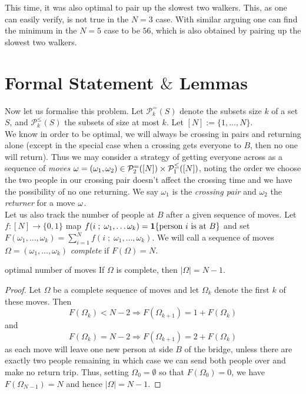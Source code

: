 \documentclass{article}
\begin{document}
This time, it was also optimal to pair up the slowest two walkers. This, as one can easily verify, is not true in the $N=3$ case. With similar 
arguing one can find the minimum in the $N=5$ case to be $56$, which is also obtained by pairing up the slowest two walkers. 

\section{Formal Statement $\&$ Lemmas}

Now let us formalise this problem. Let $\mathcal{P}_k^=(S)$ denote the subsets size $k$ of a set $S$, and $\mathcal{P}_{k}^\leq(S)$ the subsets 
of size at most $k$. Let $[N] := \{1, \dots, N\}$. \\

We know in order to be optimal, we will always be crossing in pairs and returning alone (except in the special case when a crossing gets everyone 
to $B$, then no one will return). Thus we may consider a strategy of getting everyone across as a sequence of {\it moves} ${\bf \omega} 
= (\omega_1, \omega_2) \in \mathcal{P}_2^=([N]) \times \mathcal{P}_1^\leq([N])$, noting the order we choose the two people in our crossing pair 
doesn't affect the crossing time and we have the possibility of no one returning. We say $\omega_1$ is the {\it crossing pair} and $\omega_2$ the 
{\it returner} for a move ${\bf \omega}$. \\

Let us also track the number of people at $B$ after a given sequence of moves. Let $f: [N] \to \{0,1\}$ map $f(i \; ; \; \omega_1, \dots \omega_k) 
= {\bf 1}\{\text{person } i \text{ is at } B\}$ and set $F(\omega_1, \dots, \omega_k) = \sum_{i=1}^N f(i \; ; \; \omega_1, \dots, \omega_k)$. We 
will call a sequence of moves $\Omega = (\omega_1, \dots, \omega_k)$ {\it complete} if $F(\Omega) = N$. 


\begin{lemma}[]{optimal number of moves}
  If $\Omega$ is complete, then $|\Omega| = N-1$. 
\end{lemma}

\begin{proof}
  Let $\Omega$ be a complete sequence of moves and let $\Omega_k$ denote the first $k$ of these moves. Then 
  \[F(\Omega_k) < N-2 \Longrightarrow F(\Omega_{k+1}) = 1 + F(\Omega_k)\]
  and 
  \[F(\Omega_k) = N-2 \Longrightarrow F(\Omega_{k+1}) = 2 + F(\Omega_k)\]
  as each move will leave one new person at side $B$ of the bridge, unless there are exactly two people remaining in which case we can send 
  both people over and make no return trip. Thus, setting $\Omega_0 = \emptyset$ so that $F(\Omega_0) = 0$, we have $F(\Omega_{N-1}) = N$ and 
  hence $|\Omega| = N-1$. 
\end{proof}
\end{document}
